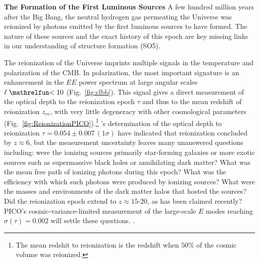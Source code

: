\documentclass[PICOReport.tex]{subfiles}
\begin{document}

{\bf The Formation of the First Luminous Sources} \hspace{0.1in} \label{luminoussources}  
A few hundred million years after the Big Bang, the neutral hydrogen gas permeating the Universe was reionized by photons emitted by the first luminous sources to have formed.  The nature of these sources and the exact history of this epoch are key missing links in our understanding of structure formation (SO5).  
% 

The reionization of the Universe imprints multiple signals in the temperature and polarization of the CMB.  In polarization, the most important signature is an enhancement in the $EE$ power spectrum at large angular scales $\ell \simlt 10$ (Fig.~\ref{fig:clbb}). This signal gives a direct measurement of the optical depth to the reionization epoch $\tau$ and thus to the mean redshift of reionization $z_{re}$, with very little degeneracy with other cosmological parameters (Fig.~\ref{fig:ReionizationPICO}).\footnote{The mean redshit to reionization is the redshift when $50$\% of the cosmic volume was reionized.} \planck 's determination of the optical depth to reionization $\tau = 0.054 \pm 0.007\, (1\sigma) $ have indicated that reionization concluded by $z \approx 6$, but the measurement uncertainty leaves many unanswered questions including: were the ionizing sources primarily star-forming galaxies or more exotic sources such as supermassive black holes or annihilating dark matter? What was the mean free path of ionizing photons during this epoch?  What was the efficiency with which such photons were produced by ionizing sources?  What were the masses and environments of the dark matter halos that hosted the sources?  Did the 
reionization epoch extend to $z \approx 15$-$20$, as has been claimed recently?~\citep{Miranda2017}
PICO's cosmic-variance-limited measurement of the large-scale $E$ modes reaching $\sigma(\tau)=0.002$ will settle these questions. 
. 
\end{document}
